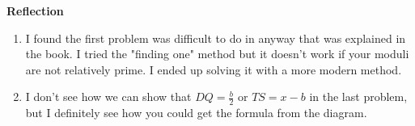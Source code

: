 \documentclass[12pt]{article}
\makeatletter
\theoremstyle{homework}
\newenvironment{exercise}[1]
{\def\@currentlabel{#1}\exercisecore}
{\endexercisecore}
\makeatother
\begin{document}
\begin{exercise}{2}
\begin{enumerate}
  \end{enumerate}


\end{exercise} 
\vspace{.5in}


\textbf{Reflection}
\begin{enumerate}
  \item I found the first problem was difficult to do in anyway that was explained in the book. I tried the "finding one" method but it doesn't
  work if your moduli are not relatively prime. I ended up solving it with a more modern method. \\
  
  \item I don't see how we can show that  $DQ = \frac{b}{2}$ or $TS = x - b$ in the last problem, but I definitely see how you could get the formula from the diagram. 

\end{enumerate}
\end{document}
